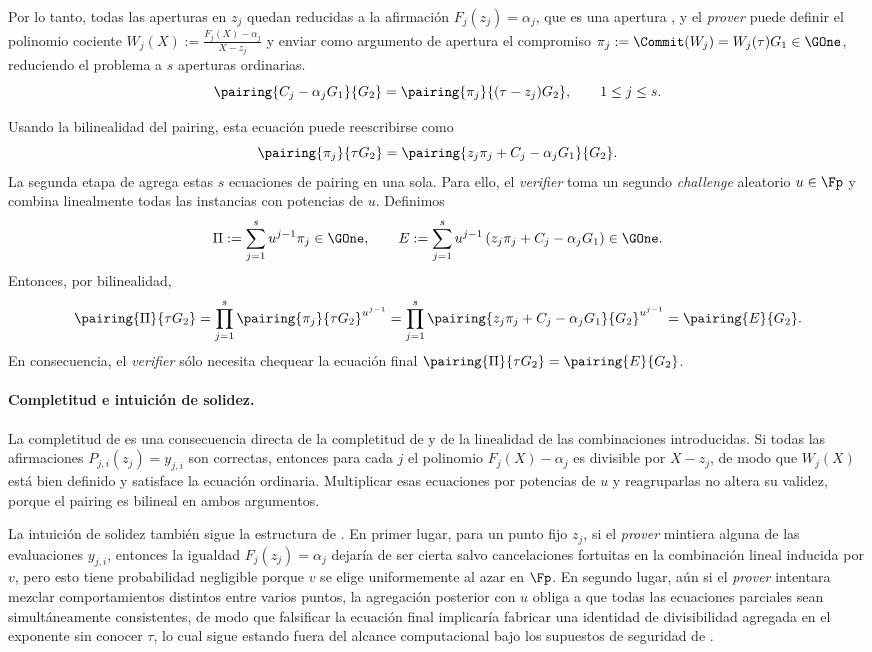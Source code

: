 Por lo tanto, todas las aperturas en $z_j$ quedan reducidas a la afirmación $F_j(z_j) = \alpha_j$, que es una apertura \KZG, y el \textit{prover} puede definir el polinomio cociente $W_j(X) := \frac{F_j(X) - \alpha_j}{X - z_j}$
y enviar como argumento de apertura el compromiso $\pi_j := \Commit(W_j) = W_j(\tau)G_1 \in \GOne$, reduciendo el problema a $s$ aperturas \KZG ordinarias.
$$\pairing{C_j - \alpha_j G_1}{G_2} = \pairing{\pi_j}{(\tau - z_j)G_2}, \qquad 1 \leq j \leq s.$$

Usando la bilinealidad del pairing, esta ecuación puede reescribirse como
$$\pairing{\pi_j}{\tau G_2} = \pairing{z_j\pi_j + C_j - \alpha_j G_1}{G_2}.$$
La segunda etapa de \GWCNineteen agrega estas $s$ ecuaciones de pairing en una sola. Para ello, el \textit{verifier} toma un segundo \textit{challenge} aleatorio $u \in \Fp$ y combina linealmente todas las instancias con potencias de $u$. Definimos
$$\Pi := \sum_{j=1}^{s} u^{j-1}\pi_j \in \GOne, \qquad E := \sum_{j=1}^{s} u^{j-1}\left(z_j\pi_j + C_j - \alpha_j G_1\right) \in \GOne.$$
Entonces, por bilinealidad,
$$\pairing{\Pi}{\tau G_2} = \prod_{j=1}^{s} \pairing{\pi_j}{\tau G_2}^{u^{j-1}} = \prod_{j=1}^{s} \pairing{z_j\pi_j + C_j - \alpha_j G_1}{G_2}^{u^{j-1}} = \pairing{E}{G_2}. $$
En consecuencia, el \textit{verifier} sólo necesita chequear la ecuación final $\pairing{\Pi}{\tau G_2} = \pairing{E}{G_2}$.

\paragraph{Completitud e intuición de solidez.}
La completitud de \GWCNineteen es una consecuencia directa de la completitud de \KZG y de la linealidad de las combinaciones introducidas. Si todas las afirmaciones $P_{j,i}(z_j) = y_{j,i}$ son correctas, entonces para cada $j$ el polinomio $F_j(X) - \alpha_j$ es divisible por $X - z_j$, de modo que $W_j(X)$ está bien definido y satisface la ecuación \KZG ordinaria. Multiplicar esas ecuaciones por potencias de $u$ y reagruparlas no altera su validez, porque el pairing es bilineal en ambos argumentos.

La intuición de solidez también sigue la estructura de \KZG. En primer lugar, para un punto fijo $z_j$, si el \textit{prover} mintiera alguna de las evaluaciones $y_{j,i}$, entonces la igualdad $F_j(z_j) = \alpha_j$ dejaría de ser cierta salvo cancelaciones fortuitas en la combinación lineal inducida por $v$, pero esto tiene probabilidad negligible porque $v$ se elige uniformemente al azar en $\Fp$. En segundo lugar, aún si el \textit{prover} intentara mezclar comportamientos distintos entre varios puntos, la agregación posterior con $u$ obliga a que todas las ecuaciones parciales sean simultáneamente consistentes, de modo que falsificar la ecuación final implicaría fabricar una identidad de divisibilidad agregada en el exponente sin conocer $\tau$, lo cual sigue estando fuera del alcance computacional bajo los supuestos de seguridad de \KZG.

